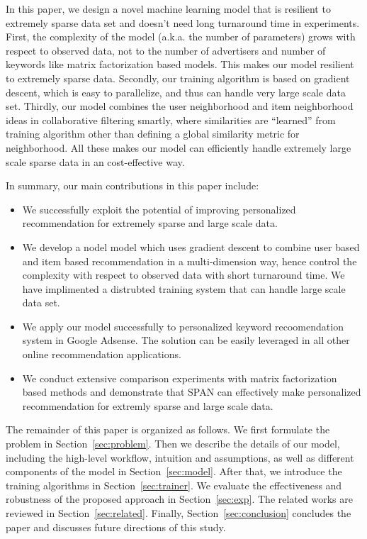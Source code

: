 In this paper, we design a novel machine learning model that is
resilient to extremely sparse data set and doesn't need long
turnaround time in experiments.  First, the complexity of the model
(a.k.a. the number of parameters) grows with respect to observed data,
not to the number of advertisers and number of keywords like matrix
factorization based models. This makes our model resilient to
extremely sparse data. Secondly, our training algorithm is based on
gradient descent, which is easy to parallelize, and thus can handle
very large scale data set. Thirdly, our model combines the user
neighborhood and item neighborhood ideas in collaborative filtering
smartly, where similarities are ``learned'' from training algorithm
other than defining a global similarity metric for neighborhood.  All
these makes our model can efficiently handle extremely large scale
sparse data in an cost-effective way.

In summary, our main contributions in this paper include:
\begin{itemize} \itemsep -1pt
\item We successfully exploit the potential of improving personalized
  recommendation for extremely sparse and large scale data.
\item We develop a nodel model which uses gradient descent to combine
  user based and item based recommendation in a multi-dimension way,
  hence control the complexity with respect to observed data with
  short turnaround time.  We have implimented a distrubted training
  system that can handle large scale data set.
\item We apply our model successfully to personalized keyword
  recoomendation system in Google Adsense. The solution can be easily
  leveraged in all other online recommendation applications.
\item We conduct extensive comparison experiments with matrix
  factorization based methods and demonstrate that SPAN can
  effectively make personalized recommendation for extremly sparse and
  large scale data.
\end{itemize}

The remainder of this paper is organized as follows. We first
formulate the problem in Section~\ref{sec:problem}. Then we describe
the details of our model, including the high-level workflow, intuition
and assumptions, as well as different components of the model in
Section~\ref{sec:model}. After that, we introduce the training
algorithms in Section~\ref{sec:trainer}. We evaluate the effectiveness
and robustness of the proposed approach in Section~\ref{sec:exp}.  The
related works are reviewed in Section~\ref{sec:related}. Finally,
Section~\ref{sec:conclusion} concludes the paper and discusses future
directions of this study.
